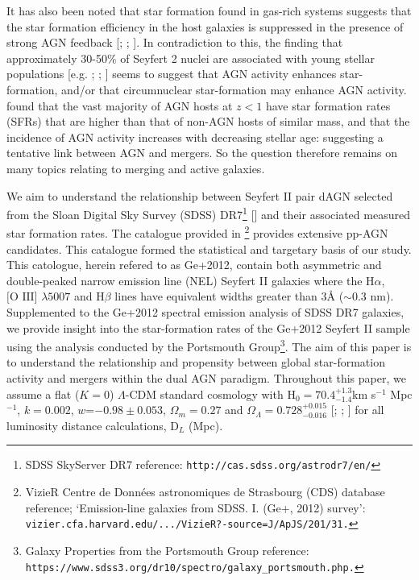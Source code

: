 It has also been noted that star formation found in gas-rich systems suggests that the star formation efficiency in the host galaxies is suppressed in the presence of strong AGN feedback [\cite{1999ApSS.266..207M}; \cite{2004AAS...204.4905B}; \cite{Di_Matteo_2005}]. In contradiction to this, the finding that approximately 30-50\% of Seyfert 2 nuclei are associated with young stellar populations [e.g. \cite{Delgado_2001}; \cite{Storchi_Bergmann_2001}; \cite{Sarzi_2006}] seems to suggest that AGN activity enhances star-formation, and/or that circumnuclear star-formation may enhance AGN activity. \cite{Silverman_2009} found that the vast majority of AGN hosts at $z<1$ have star formation rates (SFRs) that are higher than that of non-AGN hosts of similar mass, and that the incidence of AGN activity increases with decreasing stellar age: suggesting a tentative link between AGN and mergers. So the question therefore remains on many topics relating to merging and active galaxies.

We aim to understand the relationship between Seyfert II pair dAGN selected from the Sloan Digital Sky Survey (SDSS) DR7\footnote{\tiny{SDSS SkyServer DR7 reference: \tt{http://cas.sdss.org/astrodr7/en/}}} [\cite{2009ApJS..182..543A}] and their associated measured star formation rates. The catalogue provided in \cite{Ge_Hu_Wang_Bai_Zhang_2012}\footnote{\tiny{VizieR Centre de Donn\'{e}es astronomiques de Strasbourg (CDS) database reference; `Emission-line galaxies from SDSS. I. (Ge+, 2012) survey': \tt{vizier.cfa.harvard.edu/.../VizieR?-source=J/ApJS/201/31}.}} provides extensive pp-AGN candidates. This catalogue formed the statistical and targetary basis of our study. This catologue, herein refered to as Ge+2012, contain both asymmetric and double-peaked narrow emission line (NEL) Seyfert II galaxies where the $\text{H}\alpha$, $\text{[O III]}$ $\lambda{5007}$ and $\text{H}\beta$ lines have equivalent widths greater than 3\AA{ }($\sim{0.3}$ nm). Supplemented to the Ge+2012 spectral emission analysis of SDSS DR7 galaxies, we provide insight into the star-formation rates of the Ge+2012 Seyfert II sample using the analysis conducted by the Portsmouth Group\footnote{\tiny{Galaxy Properties from the Portsmouth Group reference: \tt{https://www.sdss3.org/dr10/spectro/galaxy_portsmouth.php}.}}. The aim of this paper is to understand the relationship and propensity between global star-formation activity and mergers within the dual AGN paradigm. Throughout this paper, we assume a flat ($K=0$) $\Lambda$-CDM standard cosmology with $\text{H}_0={70.4}^{+1.3}_{-1.4}$km s$^{−1}$ Mpc$^{−1}$, $k={0.002}$, $w$=$-0.98\pm{0.053}$, ${\Omega_{m}}={0.27}$ and ${\Omega_{\Lambda}}={{0.728}^{+0.015}_{-0.016}}$ [\cite{Spergel_2003}; \cite{Reid_2010}; \cite{Jarosik_2011}] for all luminosity distance calculations, $\text{D}_L$ (Mpc).